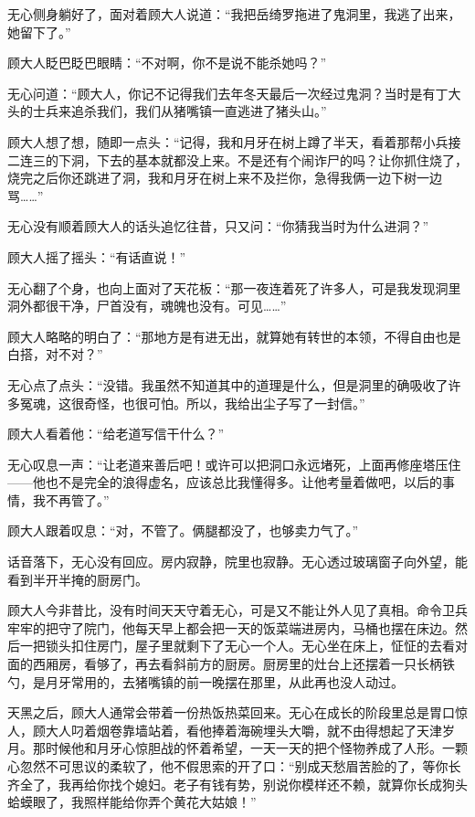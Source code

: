 无心侧身躺好了，面对着顾大人说道：``我把岳绮罗拖进了鬼洞里，我逃了出来，她留下了。''

顾大人眨巴眨巴眼睛：``不对啊，你不是说不能杀她吗？''

无心问道：``顾大人，你记不记得我们去年冬天最后一次经过鬼洞？当时是有丁大头的士兵来追杀我们，我们从猪嘴镇一直逃进了猪头山。''

顾大人想了想，随即一点头：``记得，我和月牙在树上蹲了半天，看着那帮小兵接二连三的下洞，下去的基本就都没上来。不是还有个闹诈尸的吗？让你抓住烧了，烧完之后你还跳进了洞，我和月牙在树上来不及拦你，急得我俩一边下树一边骂\ldots{}\ldots{}''

无心没有顺着顾大人的话头追忆往昔，只又问：``你猜我当时为什么进洞？''

顾大人摇了摇头：``有话直说！''

无心翻了个身，也向上面对了天花板：``那一夜连着死了许多人，可是我发现洞里洞外都很干净，尸首没有，魂魄也没有。可见\ldots{}\ldots{}''

顾大人略略的明白了：``那地方是有进无出，就算她有转世的本领，不得自由也是白搭，对不对？''

无心点了点头：``没错。我虽然不知道其中的道理是什么，但是洞里的确吸收了许多冤魂，这很奇怪，也很可怕。所以，我给出尘子写了一封信。''

顾大人看着他：``给老道写信干什么？''

无心叹息一声：``让老道来善后吧！或许可以把洞口永远堵死，上面再修座塔压住——他也不是完全的浪得虚名，应该总比我懂得多。让他考量着做吧，以后的事情，我不再管了。''

顾大人跟着叹息：``对，不管了。俩腿都没了，也够卖力气了。''

话音落下，无心没有回应。房内寂静，院里也寂静。无心透过玻璃窗子向外望，能看到半开半掩的厨房门。

顾大人今非昔比，没有时间天天守着无心，可是又不能让外人见了真相。命令卫兵牢牢的把守了院门，他每天早上都会把一天的饭菜端进房内，马桶也摆在床边。然后一把锁头扣住房门，屋子里就剩下了无心一个人。无心坐在床上，怔怔的去看对面的西厢房，看够了，再去看斜前方的厨房。厨房里的灶台上还摆着一只长柄铁勺，是月牙常用的，去猪嘴镇的前一晚摆在那里，从此再也没人动过。

天黑之后，顾大人通常会带着一份热饭热菜回来。无心在成长的阶段里总是胃口惊人，顾大人叼着烟卷靠墙站着，看他捧着海碗埋头大嚼，就不由得想起了天津岁月。那时候他和月牙心惊胆战的怀着希望，一天一天的把个怪物养成了人形。一颗心忽然不可思议的柔软了，他不假思索的开了口：``别成天愁眉苦脸的了，等你长齐全了，我再给你找个媳妇。老子有钱有势，别说你模样还不赖，就算你长成狗头蛤蟆眼了，我照样能给你弄个黄花大姑娘！''

